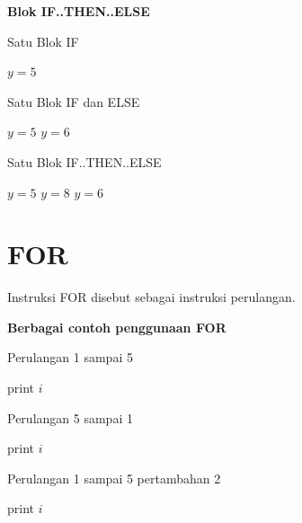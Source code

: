 \begin{contoh}
	\textbf{Blok IF..THEN..ELSE}
	\begin{algorithm}[H]
		\caption{Satu Blok IF}
		\begin{algorithmic}[1]
			\STATE $y = 5$ 
		\ENDIF
		\end{algorithmic}
	\end{algorithm}
	\begin{algorithm}[H]
		\caption{Satu Blok IF dan ELSE}
		\begin{algorithmic}[1]
			\STATE $y = 5$ 
		\ELSE
			\STATE $y = 6$ 
		\ENDIF
		\end{algorithmic}
	\end{algorithm}
	\begin{algorithm}[H]
		\caption{Satu Blok IF..THEN..ELSE}
		\begin{algorithmic}[1]
			\STATE $y = 5$ 
			\STATE $y = 8$ 
		\ELSE
			\STATE $y = 6$ 
		\ENDIF
		\end{algorithmic}
	\end{algorithm}
\end{contoh}




\section{FOR}
Instruksi FOR disebut sebagai instruksi perulangan.
\begin{contoh}
	\textbf{Berbagai contoh penggunaan FOR}
	\begin{algorithm}[H]
	\caption{Perulangan 1 sampai 5}
		\begin{algorithmic}[1]
			\STATE print $i$
		\ENDFOR
		\STATE{}
		\STATE{}
		\end{algorithmic}
	\end{algorithm}
	\begin{algorithm}[H]
	\caption{Perulangan 5 sampai 1}
		\begin{algorithmic}[1]
			\STATE print $i$
		\ENDFOR
		\STATE{}
		\end{algorithmic}
	\end{algorithm}
	\begin{algorithm}[htbp]
	\caption{Perulangan 1 sampai 5 pertambahan 2}
		\begin{algorithmic}[1]
			\STATE print $i$
		\ENDFOR
		\STATE{}
		\end{algorithmic}
	\end{algorithm}
\end{contoh}




